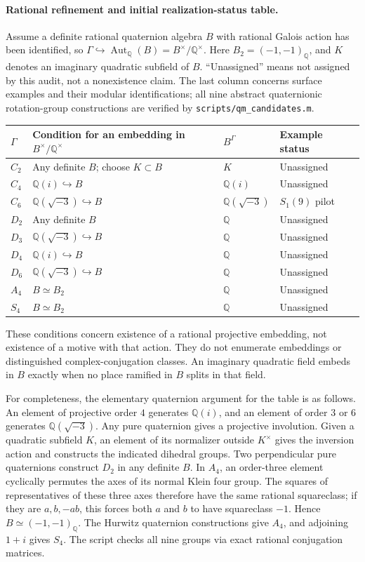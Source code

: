 \documentclass[11pt]{article}
\newcommand{\Q}{\mathbb Q}
\DeclareMathOperator{\Aut}{Aut}
\begin{document}
\paragraph{Rational refinement and initial realization-status table.}
Assume a definite rational quaternion algebra $B$ with rational Galois action
has been identified, so $\Gamma\hookrightarrow\Aut_\Q(B)=B^\times/\Q^\times$.
Here $B_2=(-1,-1)_\Q$, and $K$ denotes an imaginary quadratic subfield of $B$.
``Unassigned'' means not assigned by this audit, not a nonexistence claim.
The last column concerns surface examples and their modular identifications;
all nine abstract quaternionic rotation-group constructions are verified by
\texttt{scripts/qm\_candidates.m}.
\begin{center}\small
\begin{tabular}{llll}
\toprule
$\Gamma$ & Condition for an embedding in $B^\times/\Q^\times$ & $B^\Gamma$ & Example status\\
\midrule
$C_2$ & Any definite $B$; choose $K\subset B$ & $K$ & Unassigned\\
$C_4$ & $\Q(i)\hookrightarrow B$ & $\Q(i)$ & Unassigned\\
$C_6$ & $\Q(\sqrt{-3})\hookrightarrow B$ & $\Q(\sqrt{-3})$ & $S_1(9)$ pilot\\
$D_2$ & Any definite $B$ & $\Q$ & Unassigned\\
$D_3$ & $\Q(\sqrt{-3})\hookrightarrow B$ & $\Q$ & Unassigned\\
$D_4$ & $\Q(i)\hookrightarrow B$ & $\Q$ & Unassigned\\
$D_6$ & $\Q(\sqrt{-3})\hookrightarrow B$ & $\Q$ & Unassigned\\
$A_4$ & $B\simeq B_2$ & $\Q$ & Unassigned\\
$S_4$ & $B\simeq B_2$ & $\Q$ & Unassigned\\
\bottomrule
\end{tabular}
\end{center}
These conditions concern existence of a rational projective embedding, not
existence of a motive with that action. They do not enumerate embeddings or
distinguished complex-conjugation classes. An imaginary quadratic field embeds
in $B$ exactly when no place ramified in $B$ splits in that field.

For completeness, the elementary quaternion argument for the table is as follows.
An element of projective order $4$ generates $\Q(i)$, and an element of order
$3$ or $6$ generates $\Q(\sqrt{-3})$. Any pure quaternion gives a projective
involution. Given a quadratic subfield $K$, an element of its normalizer outside
$K^\times$ gives the inversion action and constructs the indicated dihedral
groups. Two perpendicular pure quaternions construct $D_2$ in any definite $B$.
In $A_4$, an order-three element cyclically permutes the axes of its normal
Klein four group. The squares of representatives of these three axes therefore
have the same rational squareclass; if they are $a,b,-ab$, this forces both
$a$ and $b$ to have squareclass $-1$. Hence $B\simeq(-1,-1)_\Q$.
The Hurwitz quaternion constructions give $A_4$, and adjoining $1+i$ gives
$S_4$. The script checks all nine groups via exact rational conjugation matrices.
\end{document}
